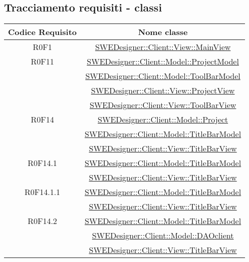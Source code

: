 \documentclass[../DefinizioneDiProdotto.tex]{subfiles}
\begin{document}
		\subsection{Tracciamento requisiti - classi}
			\normalsize
			\begin{longtable}{|c|c|}
				\hline
				\textbf{Codice Requisito} & \textbf{Nome classe} \\
				\hline
				\endhead
				R0F1
				& \hyperlink{SWEDesigner::Client::View::MainView}{SWEDesigner::Client::View::MainView}\\
				\hline

				R0F11
				& \hyperlink{SWEDesigner::Client::Model::ProjectModel}{SWEDesigner::Client::Model::ProjectModel}\\
				& \hyperlink{SWEDesigner::Client::Model::ToolBarModel}{SWEDesigner::Client::Model::ToolBarModel}\\
				& \hyperlink{SWEDesigner::Client::View::ProjectView}{SWEDesigner::Client::View::ProjectView}\\
				& \hyperlink{SWEDesigner::Client::View::ToolBarView}{SWEDesigner::Client::View::ToolBarView}\\
				\hline

				R0F14
				& \hyperlink{SWEDesigner::Client::Model::Project}{SWEDesigner::Client::Model::Project}\\
				& \hyperlink{SWEDesigner::Client::Model::TitleBarModel}{SWEDesigner::Client::Model::TitleBarModel}\\
				& \hyperlink{SWEDesigner::Client::View::TitleBarView}{SWEDesigner::Client::View::TitleBarView}\\
				\hline

				R0F14.1
				& \hyperlink{SWEDesigner::Client::Model::TitleBarModel}{SWEDesigner::Client::Model::TitleBarModel}\\
				& \hyperlink{SWEDesigner::Client::View::TitleBarView}{SWEDesigner::Client::View::TitleBarView}\\
				\hline

				R0F14.1.1
				& \hyperlink{SWEDesigner::Client::Model::TitleBarModel}{SWEDesigner::Client::Model::TitleBarModel}\\
				& \hyperlink{SWEDesigner::Client::View::TitleBarView}{SWEDesigner::Client::View::TitleBarView}\\
				\hline

				R0F14.2
				& \hyperlink{SWEDesigner::Client::Model::TitleBarModel}{SWEDesigner::Client::Model::TitleBarModel}\\
				& \hyperlink{SWEDesigner::Client::Model::DAOclient}{SWEDesigner::Client::Model::DAOclient}\\
				& \hyperlink{SWEDesigner::Client::View::TitleBarView}{SWEDesigner::Client::View::TitleBarView}\\
				\hline


\end{longtable}
\end{document}
